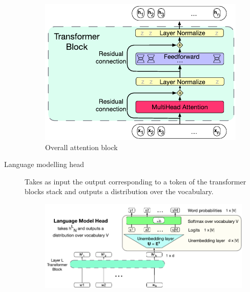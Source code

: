 \begin{description}
        \begin{figure}[H]
            \centering
            \includegraphics[width=0.4\linewidth]{./img/_attention_block.pdf}
            \caption{Overall attention block}
        \end{figure}

    \item[Language modelling head] 
        Takes as input the output corresponding to a token of the transformer blocks stack and outputs a distribution over the vocabulary.

        \begin{figure}[H]
            \centering
            \includegraphics[width=0.6\linewidth]{./img/_lm_head.pdf}
        \end{figure}
\end{description}